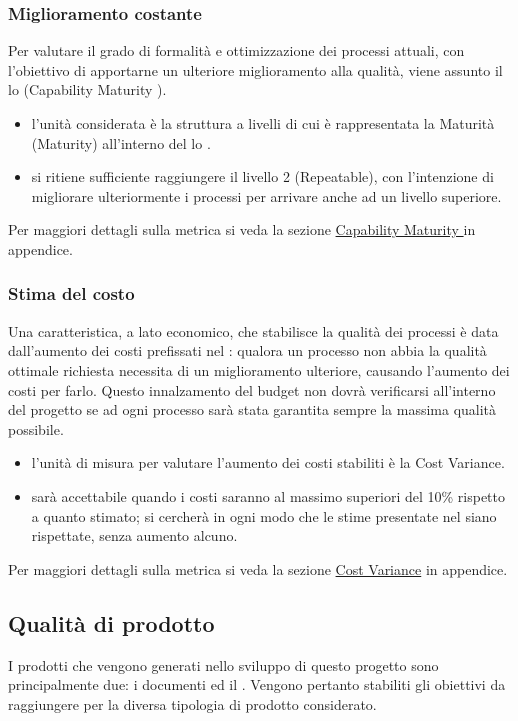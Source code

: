 \documentclass[a4paper, titlepage]{article}
\begin{document}
\subsubsection{Miglioramento costante}
Per valutare il grado di formalità e ottimizzazione dei processi attuali, con l'obiettivo di apportarne un ulteriore miglioramento alla qualità, viene assunto il lo  (Capability Maturity ).
\begin{itemize}
\item {} l'unità considerata è la struttura a livelli di cui è rappresentata la Maturità (Maturity) all'interno del lo .
\item {} si ritiene sufficiente raggiungere il livello 2 (Repeatable), con l'intenzione di migliorare ulteriormente i processi per arrivare anche ad un livello superiore.
\end{itemize}
Per maggiori dettagli sulla metrica si veda la sezione \hyperref[par:\gl{cmm}]{Capability Maturity } in appendice. 

\subsubsection{Stima del costo}
Una caratteristica, a lato economico, che stabilisce la qualità dei processi è data dall'aumento dei costi prefissati nel : qualora un processo non abbia la qualità ottimale richiesta necessita di un miglioramento ulteriore, causando l'aumento dei costi per farlo.
\newline Questo innalzamento del budget non dovrà verificarsi all'interno del progetto se ad ogni processo sarà stata garantita sempre la massima qualità possibile.
\begin{itemize}
\item {} l'unità di misura per valutare l'aumento dei costi stabiliti è la Cost Variance.
\item {} sarà accettabile quando i costi saranno al massimo superiori del 10\% rispetto a quanto stimato; si cercherà in ogni modo che le stime presentate nel  siano rispettate, senza aumento alcuno.
\end{itemize}
Per maggiori dettagli sulla metrica si veda la sezione \hyperref[par:CV]{Cost Variance} in appendice.

\subsection{Qualità di prodotto}
\label{sec:qualprod}
I prodotti che vengono generati nello sviluppo di questo progetto sono principalmente due: i documenti ed il . Vengono pertanto stabiliti gli obiettivi da raggiungere per la diversa tipologia di prodotto considerato.
\end{document}
